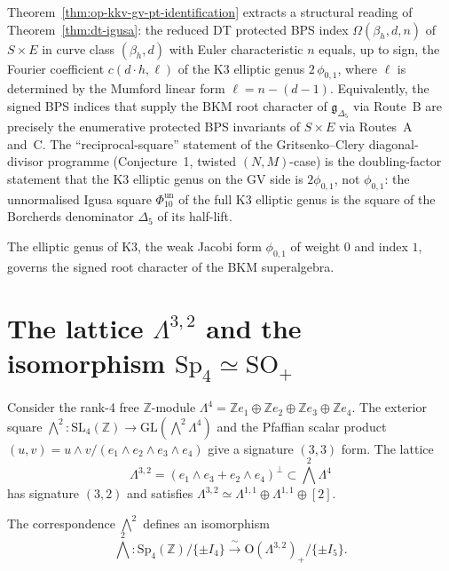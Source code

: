 \begin{remark}[The BPS index \texorpdfstring{$=$}{=} K3 elliptic genus coefficient]
\label{rem:op-bps-index-elliptic-genus-coefficient}
Theorem~\ref{thm:op-kkv-gv-pt-identification} extracts a structural
reading of Theorem~\ref{thm:dt-igusa}: the reduced DT protected BPS index
$\Omega(\beta_h, d, n)$ of $S \times E$ in curve class $(\beta_h, d)$
with Euler characteristic $n$ equals, up to sign, the Fourier
coefficient $c(d \cdot h, \ell)$ of the K3 elliptic genus
$2\,\phi_{0,1}$, where $\ell$ is determined by the Mumford linear form
$\ell = n - (d - 1)$. Equivalently, the signed BPS indices that
supply the BKM root character of $\mathfrak{g}_{\Delta_5}$ via
Route~B are precisely the enumerative protected BPS invariants of
$S \times E$ via Routes~A and~C. The ``reciprocal-square'' statement of the
Gritsenko--Clery diagonal-divisor programme (Conjecture~1, twisted
$(N, M)$-case) is the doubling-factor statement that the
K3 elliptic genus on the GV side is $2\phi_{0,1}$, not $\phi_{0,1}$:
	the unnormalised Igusa square \(\Phi_{10}^{\mathrm{un}}\) of the full K3 elliptic genus
is the square of the Borcherds denominator $\Delta_5$ of its
half-lift.
\end{remark}

The elliptic genus of K3, the weak Jacobi form $\phi_{0,1}$ of weight $0$ and index $1$, governs the signed root character of the BKM superalgebra.

\section{The lattice \texorpdfstring{$\Lambda^{3,2}$}{Lambda-3,2} and the isomorphism \texorpdfstring{$\mathrm{Sp}_4 \simeq \mathrm{SO}_+$}{Sp-4 = SO-+}}
\label{sec:k3e-lattice}

Consider the rank-4 free $\mathbb{Z}$-module $\Lambda^4 = \mathbb{Z}e_1 \oplus \mathbb{Z}e_2 \oplus \mathbb{Z}e_3 \oplus \mathbb{Z}e_4$. The exterior square $\bigwedge^2 \colon \mathrm{SL}_4(\mathbb{Z}) \to \mathrm{GL}(\bigwedge^2 \Lambda^4)$ and the Pfaffian scalar product $(u,v) = u \wedge v / (e_1 \wedge e_2 \wedge e_3 \wedge e_4)$ give a signature $(3,3)$ form. The lattice
\[
 \Lambda^{3,2} = (e_1 \wedge e_3 + e_2 \wedge e_4)^\perp \subset \bigwedge^2 \Lambda^4
\]
has signature $(3,2)$ and satisfies $\Lambda^{3,2} \simeq \Lambda^{1,1} \oplus \Lambda^{1,1} \oplus [2]$.

\begin{lemma}
\label{lem:sp4-so-iso}
The correspondence $\bigwedge^2$ defines an isomorphism
\[
 \bigwedge^2 \colon \mathrm{Sp}_4(\mathbb{Z})/\{\pm I_4\} \xrightarrow{\;\sim\;} \mathrm{O}(\Lambda^{3,2})_+/\{\pm I_5\}.
\]
\end{lemma}

